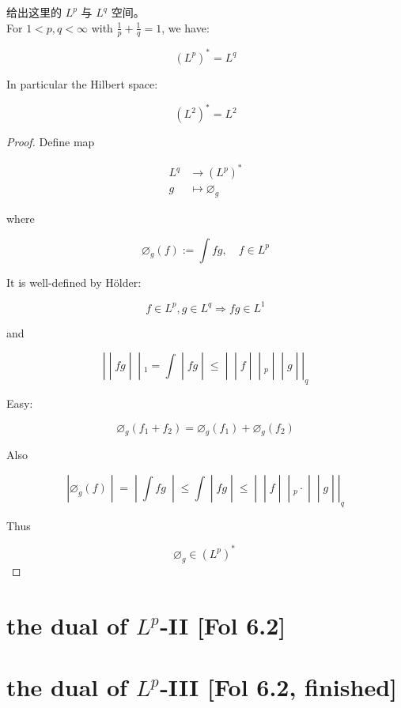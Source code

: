 \begin{theorem}{}

 给出这里的 \(L^{p}\) 与 \(L^{q}\) 空间。\\
For \(1 < p,q < \infty\) with \(\frac{1}{p} + \frac{1}{q} = 1\), we have:

\[(L^{p})^{\ast} = L^{q}\]

In particular the Hilbert space:

\[(L^{2})^{\ast} = L^{2}\]

\end{theorem}

\begin{proof}

Define map

\[\begin{matrix}
L^{q} & {\rightarrow(L^{p})^{\ast}} \\
g & {\mapsto\varnothing_{g}}
\end{matrix}\]

where

\[\varnothing_{g}(f) := \int fg,\quad f \in L^{p}\]

It is well-defined by Hölder:

\[f \in L^{p},g \in L^{q}\Longrightarrow fg \in L^{1}\]

and

\[\left. | \middle| fg \middle| \middle| {}_{1} = \int \middle| fg \middle| \leq \middle| \middle| f \middle| \middle| {}_{p} \middle| \middle| g \middle| |_{q} \right.\]

Easy:

\[\varnothing_{g}(f_{1} + f_{2}) = \varnothing_{g}(f_{1}) + \varnothing_{g}(f_{2})\]

Also

\[\left. |\varnothing_{g}(f) \middle| = \middle| \int fg\  \middle| \leq \int \middle| fg \middle| \leq \middle| \middle| f \middle| \middle| {}_{p} \cdot \middle| \middle| g \middle| |_{q} \right.\]

Thus

\[\varnothing_{g} \in (L^{p})^{\ast}\ \]

\end{proof}

\section{\texorpdfstring{the dual of \(L^{p}\)-II {[}Fol 6.2{]}}{the dual of L\^{}\{p\}-II {[}Fol 6.2{]}}}

\section{\texorpdfstring{the dual of \(L^{p}\)-III {[}Fol 6.2, finished{]}}{the dual of L\^{}\{p\}-III {[}Fol 6.2, finished{]}}}
